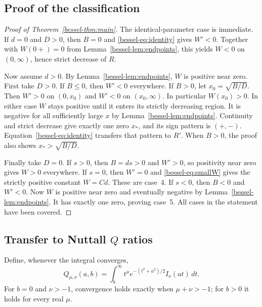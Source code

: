 \documentclass[11pt,a4paper]{article}
\theoremstyle{remark}\newtheorem{remark}[theorem]{Remark}
\numberwithin{equation}{section}
\begin{document}
\subsection{Proof of the classification}
\begin{proof}[Proof of Theorem~\ref{bessel-thm:main}]
The identical-parameter case is immediate. If $d=0$ and $D>0$,
then $B=0$ and \eqref{bessel-eq:identity} gives $W'<0$. Together with
$W(0+)=0$ from Lemma~\ref{bessel-lem:endpoints}, this yields $W<0$ on
$(0,\infty)$, hence strict decrease of $R$.

Now assume $d>0$. By Lemma~\ref{bessel-lem:endpoints}, $W$ is positive
near zero. First take $D>0$. If $B\le0$, then $W'<0$ everywhere.
If $B>0$, let $x_0=\sqrt{B/D}$. Then $W'>0$ on $(0,x_0)$ and
$W'<0$ on $(x_0,\infty)$. In particular $W(x_0)>0$.
In either case $W$ stays positive until it enters its strictly
decreasing region. It is negative for all sufficiently large $x$
by Lemma~\ref{bessel-lem:endpoints}. Continuity and strict decrease give
exactly one zero $x_*$, and its sign pattern is $(+,-)$.
Equation~\eqref{bessel-eq:identity} transfers that pattern to $R'$.
When $B>0$, the proof also shows $x_*>\sqrt{B/D}$.

Finally take $D=0$. If $s>0$, then $B=ds>0$ and $W'>0$,
so positivity near zero gives $W>0$ everywhere. If $s=0$, then
$W'=0$ and \eqref{bessel-eq:smallW} gives the strictly positive constant
$W=Cd$. These are case~4. If $s<0$, then $B<0$ and $W'<0$.
Now $W$ is positive near zero and eventually negative by
Lemma~\ref{bessel-lem:endpoints}. It has exactly one zero, proving case~5.
All cases in the statement have been covered.
\end{proof}

\subsection{Transfer to Nuttall \texorpdfstring{$Q$}{Q} ratios}
Define, whenever the integral converges,
\begin{equation}\label{bessel-eq:Q}
 Q_{\mu,\nu}(a,b)=\int_b^\infty
 t^\mu e^{-(t^2+a^2)/2}I_\nu(at)\,dt.
\end{equation}
For $b=0$ and $\nu>-1$, convergence holds exactly when
$\mu+\nu>-1$; for $b>0$ it holds for every real $\mu$.
\end{document}
